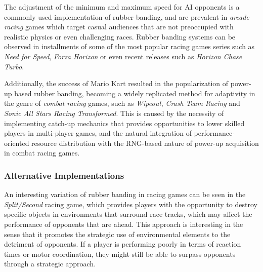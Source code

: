 
The adjustment of the minimum and maximum speed for AI opponents is a commonly used implementation of rubber banding, and are prevalent in \emph{arcade racing} games which target casual audiences that are not preoccupied with realistic physics or even challenging races. Rubber banding systems can be observed in installments of some of the most popular racing games series such as \emph{Need for Speed}, \emph{Forza Horizon} or even recent releases such as \emph{Horizon Chase Turbo}.

Additionally, the success of Mario Kart resulted in the popularization of power-up based rubber banding, becoming a widely replicated method for adaptivity in the genre of \emph{combat racing} games, such as \emph{Wipeout}, \emph{Crash Team Racing} and \emph{Sonic All Stars Racing Transformed}. This is caused by the necessity of implementing catch-up mechanics that provides opportunities to lower skilled players in multi-player games, and the natural integration of performance-oriented resource distribution with the RNG-based nature of power-up acquisition in combat racing games.  


\subsubsection{Alternative Implementations}
\label{sec:alternative-rubber-banding}

An interesting variation of rubber banding in racing games can be seen in the \emph{Split/Second} racing game, which provides players with the opportunity to destroy specific objects in environments that surround race tracks, which may affect the performance of opponents that are ahead. This approach is interesting in the sense that it promotes the strategic use of environmental elements to the detriment of opponents. If a player is performing poorly in terms of reaction times or motor coordination, they might still be able to surpass opponents through a strategic approach.


